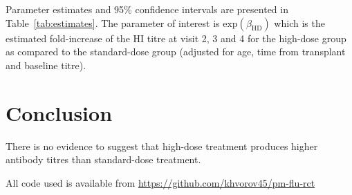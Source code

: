 \documentclass[11pt]{article}
\begin{document}
Parameter estimates and 95\% confidence intervals
are presented in Table~\ref{tab:estimates}.
The parameter of interest is $\text{exp}(\beta_{\text{HD}})$
which is the estimated
fold-increase of the HI titre at visit 2, 3 and 4 for the high-dose group
as compared to the standard-dose group (adjusted for age, time from transplant
and baseline titre).



\section{Conclusion}

There is no evidence to suggest that high-dose treatment produces
higher antibody
titres than standard-dose treatment.



All code used is available from \url{https://github.com/khvorov45/pm-flu-rct}
\end{document}
